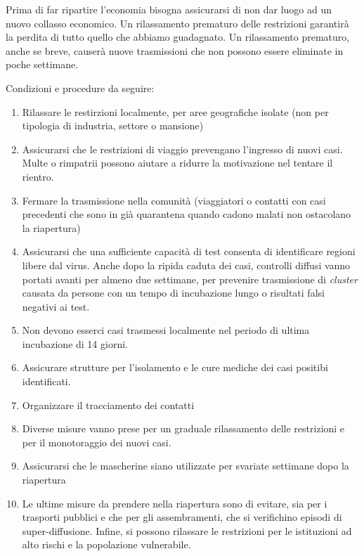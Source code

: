 \documentclass[onecolumn,journal]{IEEEtran}
\begin{document}
\large
\begin{multicols}{2}

Prima di far ripartire l'economia bisogna assicurarsi di non dar luogo ad un nuovo collasso economico. 
Un rilassamento prematuro delle restrizioni garantirà la perdita di tutto quello che abbiamo guadagnato. Un rilassamento prematuro, anche se breve, causerà nuove trasmissioni che non possono essere eliminate in poche settimane.

Condizioni e procedure da seguire:

\begin{enumerate}
  \item Rilassare le restirzioni localmente, per aree geografiche isolate (non per tipologia di industria, settore o mansione)
  \item Assicurarsi che le restrizioni di viaggio prevengano l'ingresso di nuovi casi. Multe o rimpatrii possono aiutare a ridurre la motivazione nel tentare il rientro.
  \item Fermare la trasmissione nella comunità (viaggiatori o contatti con casi precedenti che sono in già quarantena quando cadono malati non ostacolano la riapertura)
  \item Assicurarsi che una sufficiente capacità di test consenta di identificare regioni libere dal virus. Anche dopo la ripida caduta dei casi, controlli diffusi vanno portati avanti per almeno due settimane, per prevenire trasmissione di \textit{cluster} causata da persone con un tempo di incubazione lungo o risultati falsi negativi ai test.
  \item Non devono esserci casi trasmessi localmente nel periodo di ultima incubazione di 14 giorni.
  \item Assicurare strutture per l'isolamento e le cure mediche dei casi positibi identificati.
  \item Organizzare il tracciamento dei contatti
  \item Diverse misure vanno prese per un graduale rilassamento delle restrizioni e per il monotoraggio dei nuovi casi.
  \item Assicurarsi che le mascherine siano utilizzate per svariate settimane dopo la riapertura
  \item Le ultime misure da prendere nella riapertura sono di evitare, sia per i trasporti pubblici e che per gli assembramenti, che si verifichino episodi di super-diffusione. Infine, si possono rilassare le restrizioni per le istituzioni ad alto rischi e la popolazione vulnerabile.
\end{enumerate}


\end{multicols}
\end{document}

